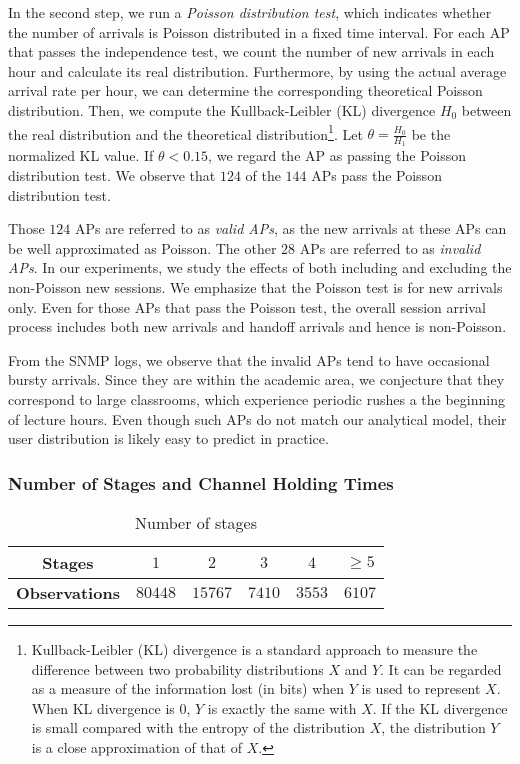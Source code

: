 In the second step, we run a \emph{Poisson distribution test}, which indicates whether the number of arrivals is Poisson distributed in a fixed time interval. For each AP that passes the independence test, we count the number of new arrivals in each hour and calculate its real distribution.  Furthermore, by using the actual average arrival rate per hour, we can determine the corresponding theoretical  Poisson distribution. Then, we compute the Kullback-Leibler (KL) divergence $H_{0}$ between the real distribution and the theoretical distribution\footnote{Kullback-Leibler (KL) divergence is a standard approach to measure the difference between two probability distributions $X$ and $Y$. It can be regarded as a measure of the information lost (in bits) when $Y$ is used to represent $X$. When KL divergence is $0$, $Y$ is exactly the same with $X$. {If the KL divergence is small compared with the  entropy  of the distribution $X$, the distribution $Y$ is a close approximation of that of $X$.}}. Let $\theta=\frac{H_{0}}{H_1}$ be the normalized KL value. If $\theta<0.15$, we regard the AP as passing the Poisson distribution test.  We observe that $124$ of the $144$ APs pass the Poisson distribution test.

Those $124$ APs are referred to as \emph{valid APs}, as the new arrivals at these APs can be well approximated as Poisson.  The other $28$ APs are referred to as \emph{invalid APs}.  In our experiments, we study the effects of both including and excluding the non-Poisson new sessions.  We emphasize that the Poisson test is for new arrivals only.  Even for those APs that pass the Poisson test, the overall session arrival process includes both new arrivals and handoff arrivals and hence is non-Poisson.

From the SNMP logs, we observe that the invalid APs tend to have occasional bursty arrivals. Since they are within the academic area, we conjecture that they correspond to large classrooms, which experience periodic rushes a the beginning of lecture hours.  Even though such APs do not match our analytical model, their user distribution is likely easy to predict in practice.


\subsubsection{Number of Stages and Channel Holding Times}

\begin{table}[tbp]
\centering
\renewcommand{\arraystretch}{1.1}
\caption{Number of stages}
\label{table2}
\small
\begin{tabular}{|c|c|c|c|c|c| }
\hline
\bfseries Stages & $1$  &  $2$  & $3$ & $4$ & $\geq 5$   \\
\hline
\bfseries Observations    & $80448$  &  $15767$  & $7410$ &   $3553$ & $6107$    \\
\hline
\end{tabular}
\end{table}





